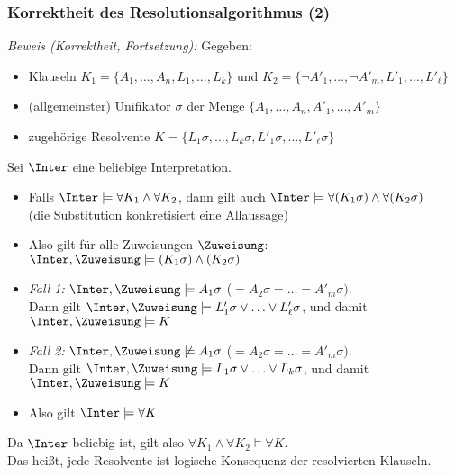 \documentclass[aspectratio=1610,onlymath]{beamer}
\begin{document}
\begin{frame}\frametitle{Korrektheit des Resolutionsalgorithmus (2)}

\emph{Beweis (Korrektheit, Fortsetzung):} Gegeben:
\begin{itemize}
\item Klauseln $K_1=\{A_1,\ldots,A_n,L_1,\ldots,L_k\}$ und $K_2=\{\neg A'_1,\ldots,\neg A'_m,L'_1,\ldots,L'_\ell\}$
\item (allgemeinster) Unifikator $\sigma$ der Menge $\{A_1,\ldots,A_n,A'_1,\ldots,A'_m\}$
\item zugehörige Resolvente $K=\{L_1\sigma,\ldots,L_k\sigma,L'_1\sigma,\ldots, L'_\ell\sigma\}$\pause
\end{itemize}

Sei $\Inter$ eine beliebige Interpretation.
\begin{itemize}
\item Falls $\Inter\models\forall K_1\wedge\forall K_2$, dann gilt auch $\Inter\models\forall (K_1\sigma)\wedge\forall (K_2\sigma)$\\ (die Substitution konkretisiert eine Allaussage)\pause
\item Also gilt für alle Zuweisungen $\Zuweisung$:~~~ $\Inter,\Zuweisung\models(K_1\sigma)\wedge (K_2\sigma)$\pause
\item \emph{Fall 1:} $\Inter,\Zuweisung\models A_1\sigma$ ($=A_2\sigma=\ldots=A'_m\sigma)$.\\ Dann gilt $\Inter,\Zuweisung\models L'_1\sigma\vee\ldots\vee L'_\ell\sigma$, und damit $\Inter,\Zuweisung\models K$\pause
\item \emph{Fall 2:} $\Inter,\Zuweisung\not\models A_1\sigma$ ($=A_2\sigma=\ldots=A'_m\sigma)$.\\ Dann gilt $\Inter,\Zuweisung\models L_1\sigma\vee\ldots\vee L_k\sigma$, und damit $\Inter,\Zuweisung\models K$\pause
\item Also gilt $\Inter\models\forall K$.
\end{itemize}
Da $\Inter$ beliebig ist, gilt also $\forall K_1\wedge\forall K_2\models \forall K$.\\
Das heißt, jede Resolvente ist logische Konsequenz der resolvierten Klauseln.

\end{frame}
\end{document}
